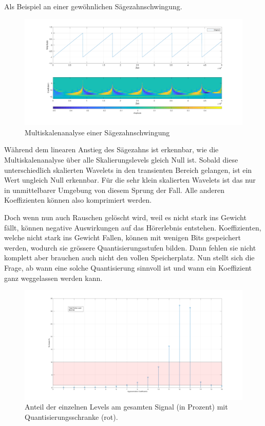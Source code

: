 \begin{refsection}
Als Beispiel an einer gewöhnlichen Sägezahnschwingung.
\begin{figure}[h]
	\centering
	\includegraphics[width=\linewidth]{papers/compress/Bilder/sawtooth}
	\caption{Multiskalenanalyse einer Sägezahnschwingung}
	\label{fig:sawtooth}
\end{figure}

Während dem linearen Anstieg des Sägezahns ist erkennbar, wie die Multiskalenanalyse über alle Skalierungslevels gleich Null ist.
Sobald diese unterschiedlich skalierten Wavelets in den transienten Bereich gelangen, ist ein Wert ungleich Null erkennbar.
Für die sehr klein skalierten Wavelets ist das nur in unmittelbarer Umgebung von diesem Sprung der Fall.
Alle anderen Koeffizienten können also komprimiert werden.

Doch wenn nun auch Rauschen gelöscht wird, weil es nicht stark ins Gewicht fällt, können negative Auswirkungen auf das Hörerlebnis entstehen. 
Koeffizienten, welche nicht stark ins Gewicht Fallen, können mit wenigen Bits gespeichert werden, wodurch sie grössere Quantisierungsstufen bilden. 
Dann fehlen sie nicht komplett aber brauchen auch nicht den vollen Speicherplatz.
Nun stellt sich die Frage, ab wann eine solche Quantisierung sinnvoll ist und wann ein Koeffizient ganz weggelassen werden kann. 

\begin{figure}[h]
	\centering
	\includegraphics[width=\linewidth]{papers/compress/Bilder/recCoefs}
	\caption{Anteil der einzelnen Levels am gesamten Signal (in Prozent) mit Quantisierungsschranke (rot).}
	\label{fig:coefficients}
\end{figure} 


\end{refsection}
